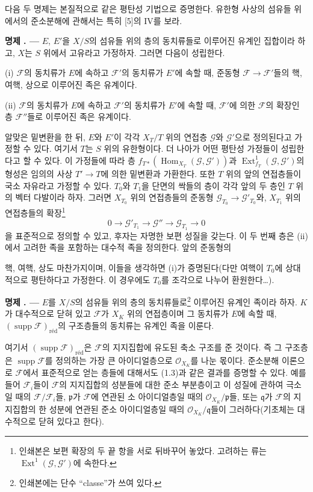 \documentclass[11pt,twoside,openany]{book}
\numberwithin{equation}{section}
\newcommand{\sourceunit}{front}
\newcommand{\src}[1]{%
  \phantomsection\hypertarget{src:\sourceunit:#1}{}%
  \marginpar{\raggedleft\footnotesize\sffamily #1}%
}
\theoremstyle{plain}
\theoremstyle{definition}
\theoremstyle{remark}
\newcommand{\result}[2]{%
  \par\medskip\noindent\textbf{#1%
  \if\relax\detokenize{#2}\relax\else\space#2\fi. ---}\enspace
}
\begin{document}
다음 두 명제는 본질적으로 같은 평탄성 기법으로 증명한다. 유한형 사상의
섬유들 위에서의 준소분해에 관해서는 특히 [5]의 IV를 보라.

\result{명제}{1.2} $E$, $E'$을 $X/S$의 섬유들 위의 층의 동치류들로
이루어진 유계인 집합이라 하고, $X$는 $S$ 위에서 고유라고 가정하자. 그러면
다음이 성립한다.

\medskip
\noindent (i) $\mathcal F$의 동치류가 $E$에 속하고 $\mathcal F'$의
동치류가 $E'$에 속할 때, 준동형
$\mathcal F\longrightarrow\mathcal F'$들의 핵, 여핵, 상으로 이루어진
족은 유계이다.

\smallskip
\noindent (ii) $\mathcal F$의 동치류가 $E$에 속하고 $\mathcal F'$의
동치류가 $E'$에 속할 때, $\mathcal F'$에 의한 $\mathcal F$의 확장인
층 $\mathcal F''$들로 이루어진 족은 유계이다.

알맞은 밑변환을 한 뒤, $E$와 $E'$이 각각 $X_T/T$ 위의 연접층
$\mathcal G$와 $\mathcal G'$으로 정의된다고 가정할 수 있다. 여기서
$T$는 $S$ 위의 유한형이다. 더 나아가 어떤 평탄성 가정들이 성립한다고
할 수 있다. 이 가정들에 따라 층
$f_{T*}(\operatorname{Hom}_{X_T}(\mathcal G,\mathcal G'))$과
$\operatorname{Ext}^{1}_{f_T}(\mathcal G,\mathcal G')$의 형성은
임의의 사상 $T'\longrightarrow T$에 의한 밑변환과 가환한다. 또한 $T$
위의 앞의 연접층들이 국소 자유라고 가정할 수 있다. $T_0$와 $T_1$을
단면의 싹들의 층이 각각 앞의 두 층인 $T$ 위의 벡터 다발이라 하자. 그러면
$X_{T_0}$ 위의 연접층들의 준동형
$\mathcal G_{T_0}\longrightarrow\mathcal G'_{T_0}$와, $X_{T_1}$ 위의
연접층들의 확장\footnote{인쇄본은 보편 확장의 두
끝 항을 서로 뒤바꾸어 놓았다. 고려하는 류는
$\operatorname{Ext}^1(\mathcal G,\mathcal G')$에 속한다.}
\[
0\longrightarrow\mathcal G'_{T_1}\longrightarrow\mathcal G''
\longrightarrow\mathcal G_{T_1}\longrightarrow0
\]
을 표준적으로 정의할 수 있고, 후자는 자명한 보편 성질을 갖는다. 이 두 번째
층은 (ii)에서 고려한 족을 포함하는 대수적 족을 정의한다. 앞의 준동형의
\src{253}
핵, 여핵, 상도 마찬가지이며, 이들을 생각하면 (i)가 증명된다(다만 여핵이
$T_0$에 상대적으로 평탄하다고 가정한다. 이 경우에도 $T_0$를 조각으로
나누어 환원한다\ldots).

\result{명제}{1.3} $E$를 $X/S$의 섬유들 위의 층의
동치류들로\footnote{인쇄본에는 단수 ``classe''가
쓰여 있다.} 이루어진 유계인 족이라 하자. $K$가 대수적으로 닫혀 있고
$\mathcal F$가 $X_K$ 위의 연접층이며 그 동치류가 $E$에 속할 때,
$(\operatorname{supp}\mathcal F)_{\mathrm{réd}}$의 구조층들의 동치류는
유계인 족을 이룬다.

여기서 $(\operatorname{supp}\mathcal F)_{\mathrm{réd}}$은
$\mathcal F$의 지지집합에 유도된 축소 구조를 준 것이다. 즉 그 구조층은
$\operatorname{supp}\mathcal F$를 정의하는 가장 큰 아이디얼층으로
$\mathcal O_{X_K}$를 나눈 몫이다. 준소분해 이론으로 $\mathcal F$에서
표준적으로 얻는 층들에 대해서도 (1.3)과 같은 결과를 증명할 수 있다. 예를
들어 $\mathcal F_i$들이 $\mathcal F$의 지지집합의 성분들에 대한 준소
부분층이고 이 성질에 관하여 극소일 때의 $\mathcal F/\mathcal F_i$들,
$\mathfrak p$가 $\mathcal F$에 연관된 소 아이디얼층일 때의
$\mathcal O_{X_K}/\mathfrak p$들, 또는 $\mathfrak q$가 $\mathcal F$의
지지집합의 한 성분에 연관된 준소 아이디얼층일 때의
$\mathcal O_{X_K}/\mathfrak q$들이 그러하다(기초체는 대수적으로 닫혀 있다고
한다).
\end{document}
